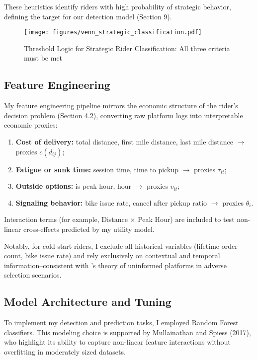 These heuristics identify riders with high probability of strategic behavior, defining the target for our detection model (Section 9).

\begin{figure}[H]
\centering
\texttt{[image: figures/venn\_strategic\_classification.pdf]}
\caption{Threshold Logic for Strategic Rider Classification: All three criteria must be met}
\label{fig:venn}
\end{figure}

\subsection{Feature Engineering}

My feature engineering pipeline mirrors the economic structure of the rider's decision problem (Section 4.2), converting raw platform logs into interpretable economic proxies:

\begin{enumerate}
    \item \textbf{Cost of delivery:} total distance, first mile distance, last mile distance $\rightarrow$ proxies $c(d_{ij})$;
    \item \textbf{Fatigue or sunk time:} session time, time to pickup $\rightarrow$ proxies $\tau_{it}$;
    \item \textbf{Outside options:} is peak hour, hour $\rightarrow$ proxies $v_{it}$;
    \item \textbf{Signaling behavior:} bike issue rate, cancel after pickup ratio $\rightarrow$ proxies $\theta_i$.
\end{enumerate}

Interaction terms (for example, Distance $\times$ Peak Hour) are included to test non-linear cross-effects predicted by my utility model.

Notably, for cold-start riders, I exclude all historical variables (lifetime order count, bike issue rate) and rely exclusively on contextual and temporal information--consistent with \citeauthor{akerlof1970lemons}'s theory of uninformed platforms in adverse selection scenarios.

\subsection{Model Architecture and Tuning}

To implement my detection and prediction tasks, I employed Random Forest classifiers. This modeling choice is supported by Mullainathan and Spiess (2017), who highlight its ability to capture non-linear feature interactions without overfitting in moderately sized datasets.


